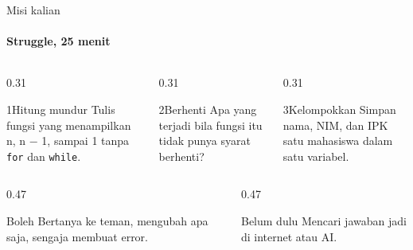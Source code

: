 \documentclass[t]{beamer}
\begin{document}

\begin{frame}{Misi kalian}
\framesubtitle{Struggle, 25 menit}
\begin{columns}[T]
\begin{column}{0.31\textwidth}
\begin{Langkah}{1}{Hitung mundur}
Tulis fungsi yang menampilkan n, n − 1, sampai 1 tanpa \texttt{for} dan \texttt{while}.
\end{Langkah}
\end{column}
\begin{column}{0.31\textwidth}
\begin{Langkah}{2}{Berhenti}
Apa yang terjadi bila fungsi itu tidak punya syarat berhenti?
\end{Langkah}
\end{column}
\begin{column}{0.31\textwidth}
\begin{Langkah}{3}{Kelompokkan}
Simpan nama, NIM, dan IPK satu mahasiswa dalam satu variabel.
\end{Langkah}
\end{column}
\end{columns}
\vspace{8pt}
\begin{columns}[T]
\begin{column}{0.47\textwidth}
\begin{Blok}{Boleh}
Bertanya ke teman, mengubah apa saja, sengaja membuat error.
\end{Blok}
\end{column}
\begin{column}{0.47\textwidth}
\begin{BlokAlert}{Belum dulu}
Mencari jawaban jadi di internet atau AI.
\end{BlokAlert}
\end{column}
\end{columns}
\end{frame}
\end{document}
